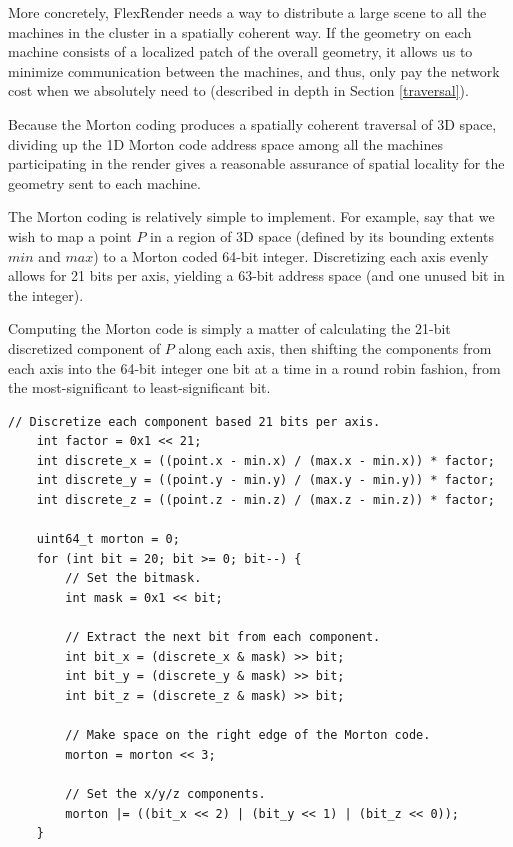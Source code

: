 \documentclass[12pt]{ucthesis}
\begin{document}
More concretely, FlexRender needs a way to distribute a large scene to all the
machines in the cluster in a spatially coherent way. If the geometry on each
machine consists of a localized patch of the overall geometry, it allows us to
minimize communication between the machines, and thus, only pay the network cost
when we absolutely need to (described in depth in Section \ref{traversal}).

Because the Morton coding produces a spatially coherent traversal of 3D space,
dividing up the 1D Morton code address space among all the machines participating
in the render gives a reasonable assurance of spatial locality for the geometry
sent to each machine.

The Morton coding is relatively simple to implement. For example, say that
we wish to map a point $P$ in a region of 3D space (defined by its bounding extents
$min$ and $max$) to a Morton coded 64-bit integer. Discretizing each axis evenly
allows for 21 bits per axis, yielding a 63-bit address space (and one unused bit
in the integer).

Computing the Morton code is simply a matter of calculating the 21-bit discretized
component of $P$ along each axis, then shifting the components from each axis
into the 64-bit integer one bit at a time in a round robin fashion, from the
most-significant to least-significant bit.

\begin{lstlisting}[caption=Example of computing the Morton code.,label=mortoncode]
    // Discretize each component based 21 bits per axis.
    int factor = 0x1 << 21;
    int discrete_x = ((point.x - min.x) / (max.x - min.x)) * factor;
    int discrete_y = ((point.y - min.y) / (max.y - min.y)) * factor;
    int discrete_z = ((point.z - min.z) / (max.z - min.z)) * factor;

    uint64_t morton = 0;
    for (int bit = 20; bit >= 0; bit--) {
        // Set the bitmask.
        int mask = 0x1 << bit;

        // Extract the next bit from each component.
        int bit_x = (discrete_x & mask) >> bit;
        int bit_y = (discrete_y & mask) >> bit;
        int bit_z = (discrete_z & mask) >> bit;

        // Make space on the right edge of the Morton code.
        morton = morton << 3;

        // Set the x/y/z components.
        morton |= ((bit_x << 2) | (bit_y << 1) | (bit_z << 0));
    }
\end{lstlisting}
\end{document}
